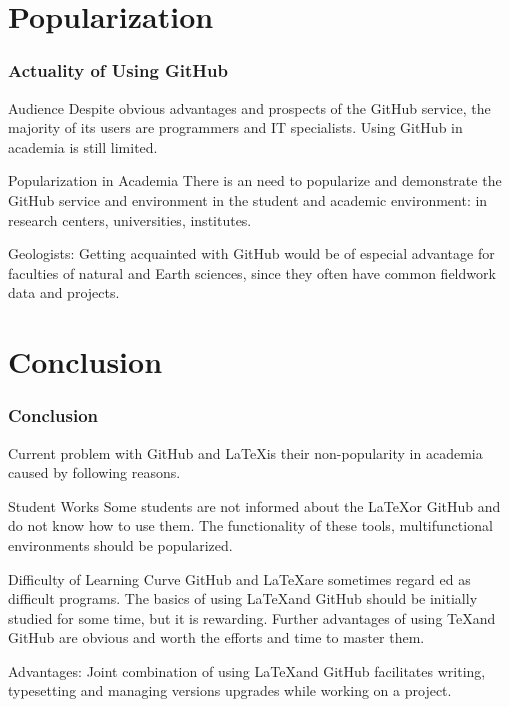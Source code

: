 \documentclass[pdflatex,compress,8pt,
	xcolor={dvipsnames,dvipsnames,svgnames,x11names,table},
	hyperref={
	breaklinks = true, 
	pdfauthor={Lemenkova Polina}, 
	pdfsubject={Preentation}, 
	pdfcreator={Lemenkova Polina}, 
	pdfproducer={Lemenkova Polina}, 
	colorlinks=true,linkcolor=blue, 
	citecolor=NavyBlue, 
	urlcolor = NavyBlue, 
	breaklinks = true}]{beamer}
\begin{document}
\section{Popularization}
\begin{frame}\frametitle{Actuality of Using GitHub}

\begin{alertblock}{Audience}
Despite obvious advantages and prospects of the GitHub service, the majority of its users are programmers and IT specialists. Using GitHub in academia is still limited. 
\end{alertblock}

\begin{block}{Popularization in Academia}
There is an need to popularize and demonstrate the GitHub service and environment in the student and academic environment: in research centers, universities, institutes.
\end{block}

\begin{examples}{Geologists:}
Getting acquainted with GitHub would be of especial advantage for faculties of natural and Earth sciences, since they often have common fieldwork data and projects.
\end{examples}

\end{frame}

\section{Conclusion}
\begin{frame}\frametitle{Conclusion}
\vspace{1em}
Current problem with GitHub and \LaTeX \space is their non-popularity in academia caused by following reasons.

\begin{alertblock}{Student Works}
Some students are not informed about the \LaTeX \space or GitHub and do not know how to use them. The functionality of these tools, multifunctional environments should be popularized.
\end{alertblock}

\begin{block}{Difficulty of Learning Curve}
GitHub and \LaTeX \space are sometimes regard ed as difficult programs. The basics of using \LaTeX \space and GitHub should be initially studied for some time, but it is rewarding. Further advantages of using \TeX \space and GitHub are obvious and worth the efforts and time to master them.
\end{block}

\begin{examples}{Advantages:}
Joint combination of using \LaTeX \space and GitHub facilitates writing, typesetting and managing versions upgrades while working on a project. 
\end{examples}
\end{frame}
\end{document}
